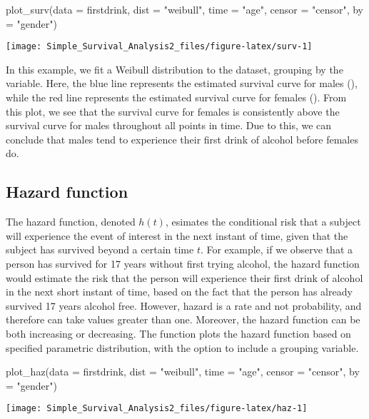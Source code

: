 \begin{Schunk}
\begin{Sinput}
plot_surv(data = firstdrink, dist = "weibull", time = "age", censor = "censor", by = "gender")
\end{Sinput}

\texttt{[image: Simple\_Survival\_Analysis2\_files/figure-latex/surv-1]} \end{Schunk}

In this example, we fit a Weibull distribution to the 
dataset, grouping by the  variable. Here, the blue line
represents the estimated survival curve for males (),
while the red line represents the estimated survival curve for females
(). From this plot, we see that the survival curve for
females is consistently above the survival curve for males throughout
all points in time. Due to this, we can conclude that males tend to
experience their first drink of alcohol before females do.

\hypertarget{hazard-function}{%
\subsection{Hazard function}\label{hazard-function}}

The hazard function, denoted \(h(t)\), esimates the conditional risk
that a subject will experience the event of interest in the next instant
of time, given that the subject has survived beyond a certain time
\(t\). For example, if we observe that a person has survived for 17
years without first trying alcohol, the hazard function would estimate
the risk that the person will experience their first drink of alcohol in
the next short instant of time, based on the fact that the person has
already survived 17 years alcohol free. However, hazard is a rate and
not probability, and therefore can take values greater than one.
Moreover, the hazard function can be both increasing or decreasing. The
 function plots the hazard function based on specified
parametric distribution, with the option to include a grouping variable.

\begin{Schunk}
\begin{Sinput}
plot_haz(data = firstdrink, dist = "weibull", time = "age", censor = "censor",  by = "gender")
\end{Sinput}

\texttt{[image: Simple\_Survival\_Analysis2\_files/figure-latex/haz-1]} \end{Schunk}

